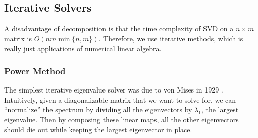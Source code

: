 \subsection{Iterative Solvers} 

  A disadvantage of decomposition is that the time complexity of SVD on a $n \times m$ matrix is $O(nm \min\{n, m\})$. Therefore, we use iterative methods, which is really just applications of numerical linear algebra. 

\subsubsection{Power Method} 

  The simplest iterative eigenvalue solver was due to von Mises in 1929 \cite{1929vonmises}. Intuitively, given a diagonalizable matrix that we want to solve for, we can  ``normalize'' the spectrum by dividing all the eigenvectors by $\lambda_1$, the largest eigenvalue. Then by composing these \hyperref[lin-def:linear_map]{linear maps}, all the other eigenvectors should die out while keeping the largest eigenvector in place. 

